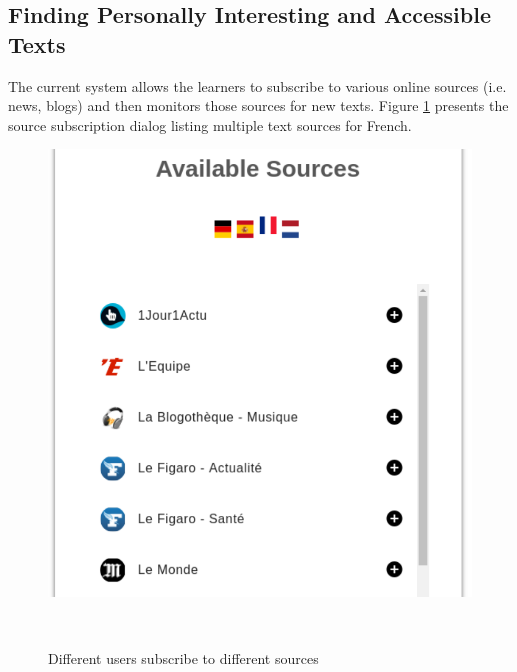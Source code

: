 


  

\subsection{Finding Personally Interesting and Accessible Texts}
The current system allows the learners to subscribe to various online sources (i.e. news, blogs) and then monitors those sources for new texts. Figure \ref{fig:system_subscriptions} presents the source subscription dialog listing multiple text sources for French.



    \begin{figure}[h!]
    \centering
      \includegraphics[width=0.40\columnwidth]{figures/available_sources_short}
      \caption{Different users subscribe to different sources}~\label{fig:system_subscriptions}
    \end{figure}

